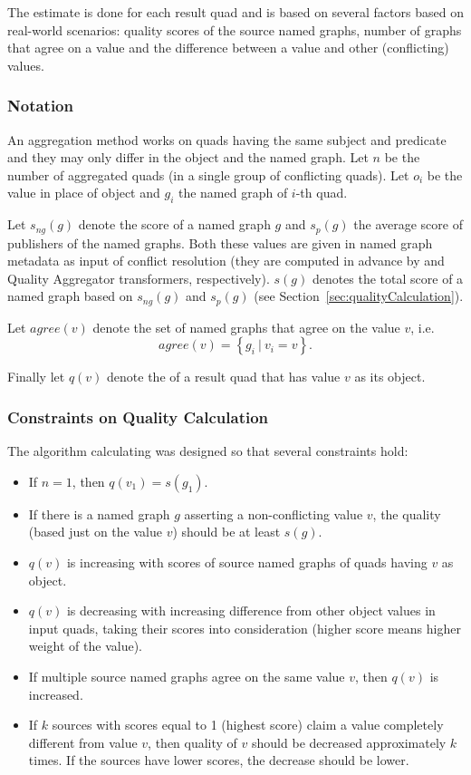The \aggrq estimate is done for each result quad and is based on several factors based on real-world scenarios: quality scores of the source named graphs, number of graphs that agree on a value and the difference between a value and other (conflicting) values.

\subsubsection{Notation}
An aggregation method works on quads having the same subject and predicate and they may only differ in the object and the named graph. Let $n$ be the number of aggregated quads (in a single group of conflicting quads). Let $o_i$ be the value in place of object and $g_i$ the named graph of $i$-th quad.

Let $s_{ng}(g)$ denote the \QA score of a named graph $g$ and $s_p(g)$ the average score of publishers of the named graphs. Both these values are given in named graph metadata as input of conflict resolution (they are computed in advance by \QA and Quality Aggregator transformers, respectively). $s(g)$  denotes the total score of a named graph based on $s_{ng}(g)$ and $s_p(g)$ (see Section~\ref{sec:qualityCalculation}).

Let $agree(v)$ denote the set of named graphs that agree on the value $v$, i.e. $$agree(v) = \left\{g_i~|~v_i=v\right\}.$$

Finally let $q(v)$ denote the \aggrq of a result quad that has value $v$ as its object.

\subsubsection{Constraints on Quality Calculation}
The algorithm calculating \aggrq was designed so that several constraints hold:
\begin{itemize}
	\item If $n= 1$, then $q(v_1) = s(g_1)$.
	\item If there is a named graph $g$ asserting a non-conflicting value $v$, the quality (based just on the value $v$) should be at least $s(g)$.
	\item $q(v)$ is increasing with \QA scores of source named graphs of quads having $v$ as object.
	\item $q(v)$ is decreasing with increasing difference from other object values in input quads, taking their \QA scores into consideration (higher \QA score means higher weight of the value).
	\item If multiple source named graphs agree on the same value $v$, then $q(v)$ is increased.
	\item If $k$ sources with \QA scores equal to 1 (highest score) claim a value completely different from value $v$, then quality of $v$ should be decreased approximately $k$ times. If the sources have lower \QA scores, the decrease should be lower.
\end{itemize}

